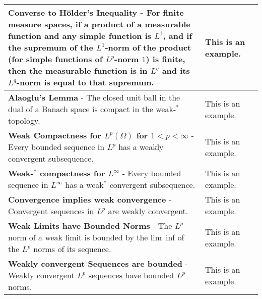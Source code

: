 \begin{longtable}{|*{3}{>{\centering\arraybackslash}p{}|}}
            \textbf{Converse to H\"{o}lder's Inequality} - For finite measure spaces, if a product of a measurable function and any simple function is $L^1$, and if the supremum of the $L^1$-norm of the product (for simple functions of $L^p$-norm $1$) is finite, then the measurable function is in $L^q$ and its $L^q$-norm is equal to that supremum. \newline {$\!\begin{gathered}M(g) = \sup_{\norm{f}_p = 1} \left\{\abs{\int_\Omega fg \dd\mu} : f \text{ is simple}\right\} < \infty \\ \implies \\ g \in L^q(\Omega)\ \ \text{and}\ \ \norm{g}_q = M(g) \end{gathered}$} & This is an example. \\[6pt] \hline
            
            \textbf{Alaoglu's Lemma} - The closed unit ball in the dual of a Banach space is compact in the weak-$^*$ topology. & This is an example. \\[6pt] \hline
            
            \textbf{Weak Compactness for $L^p(\Omega)$ for $1 < p < \infty$} - Every bounded sequence in $L^p$ has a weakly convergent subsequence. & This is an example. \\[6pt] \hline
            
            \textbf{Weak-$^*$ compactness for $L^\infty$} - Every bounded sequence in $L^\infty$ has a weak$^*$ convergent subsequence. & This is an example. \\[6pt] \hline
            
            \textbf{Convergence implies weak convergence} - Convergent sequences in $L^p$ are weakly convergent. & This is an example. \\[6pt] \hline
            
            \textbf{Weak Limits have Bounded Norms} - The $L^p$ norm of a weak limit is bounded by the lim~inf of the $L^p$ norms of its sequence. & This is an example. \\[6pt] \hline
            
            \textbf{Weakly convergent Sequences are bounded} - Weakly convergent $L^p$ sequences have bounded $L^p$ norms. & This is an example. \\[6pt] \hline
            

\end{longtable}
